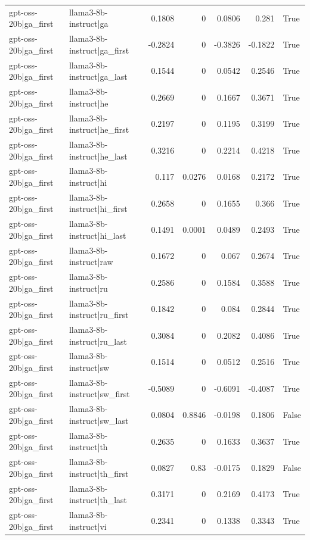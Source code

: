 \begin{table}
\begin{tabular}{l l r r r r l}
gpt-oss-20b|ga_first & llama3-8b-instruct|ga & 0.1808 & 0 & 0.0806 & 0.281 & True \\
gpt-oss-20b|ga_first & llama3-8b-instruct|ga_first & -0.2824 & 0 & -0.3826 & -0.1822 & True \\
gpt-oss-20b|ga_first & llama3-8b-instruct|ga_last & 0.1544 & 0 & 0.0542 & 0.2546 & True \\
gpt-oss-20b|ga_first & llama3-8b-instruct|he & 0.2669 & 0 & 0.1667 & 0.3671 & True \\
gpt-oss-20b|ga_first & llama3-8b-instruct|he_first & 0.2197 & 0 & 0.1195 & 0.3199 & True \\
gpt-oss-20b|ga_first & llama3-8b-instruct|he_last & 0.3216 & 0 & 0.2214 & 0.4218 & True \\
gpt-oss-20b|ga_first & llama3-8b-instruct|hi & 0.117 & 0.0276 & 0.0168 & 0.2172 & True \\
gpt-oss-20b|ga_first & llama3-8b-instruct|hi_first & 0.2658 & 0 & 0.1655 & 0.366 & True \\
gpt-oss-20b|ga_first & llama3-8b-instruct|hi_last & 0.1491 & 0.0001 & 0.0489 & 0.2493 & True \\
gpt-oss-20b|ga_first & llama3-8b-instruct|raw & 0.1672 & 0 & 0.067 & 0.2674 & True \\
gpt-oss-20b|ga_first & llama3-8b-instruct|ru & 0.2586 & 0 & 0.1584 & 0.3588 & True \\
gpt-oss-20b|ga_first & llama3-8b-instruct|ru_first & 0.1842 & 0 & 0.084 & 0.2844 & True \\
gpt-oss-20b|ga_first & llama3-8b-instruct|ru_last & 0.3084 & 0 & 0.2082 & 0.4086 & True \\
gpt-oss-20b|ga_first & llama3-8b-instruct|sw & 0.1514 & 0 & 0.0512 & 0.2516 & True \\
gpt-oss-20b|ga_first & llama3-8b-instruct|sw_first & -0.5089 & 0 & -0.6091 & -0.4087 & True \\
gpt-oss-20b|ga_first & llama3-8b-instruct|sw_last & 0.0804 & 0.8846 & -0.0198 & 0.1806 & False \\
gpt-oss-20b|ga_first & llama3-8b-instruct|th & 0.2635 & 0 & 0.1633 & 0.3637 & True \\
gpt-oss-20b|ga_first & llama3-8b-instruct|th_first & 0.0827 & 0.83 & -0.0175 & 0.1829 & False \\
gpt-oss-20b|ga_first & llama3-8b-instruct|th_last & 0.3171 & 0 & 0.2169 & 0.4173 & True \\
gpt-oss-20b|ga_first & llama3-8b-instruct|vi & 0.2341 & 0 & 0.1338 & 0.3343 & True \\

\end{tabular}
\end{table}
